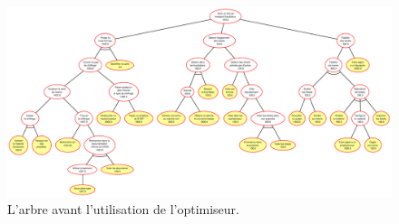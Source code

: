         \begin{landscape}
            \begin{figure}
                \centering
                \includegraphics[height=0.82\textwidth]{figure/pre_optimiseur.pdf}
                \caption{L'arbre avant l'utilisation de l'optimiseur.}
                \label{fig:pre_optimiseur}
            \end{figure}
        \end{landscape}     
    
